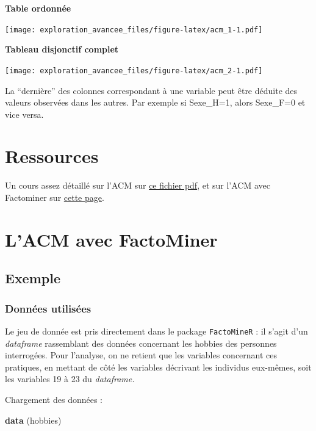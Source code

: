 \documentclass[]{book}
\newenvironment{Shaded}{\begin{snugshade}}{\end{snugshade}}
\newcommand{\KeywordTok}[1]{\textcolor[rgb]{0.13,0.29,0.53}{\textbf{#1}}}
\newcommand{\NormalTok}[1]{#1}
\begin{document}
\textbf{Table ordonnée}

\texttt{[image: exploration\_avancee\_files/figure-latex/acm\_1-1.pdf]}

\textbf{Tableau disjonctif complet}

\texttt{[image: exploration\_avancee\_files/figure-latex/acm\_2-1.pdf]}

La ``dernière'' des colonnes correspondant à une variable peut être déduite des valeurs observées dans les autres. Par exemple si Sexe\_H=1, alors Sexe\_F=0 et vice versa.

\hypertarget{ressources-1}{%
\section{Ressources}\label{ressources-1}}

Un cours assez détaillé sur l'ACM sur \href{https://www.math.u-bordeaux.fr/~machaven/wordpress/wp-content/uploads/2013/10/ACM.pdf}{ce fichier pdf}, et sur l'ACM avec Factominer sur \href{http://factominer.free.fr/factomethods/analyse-des-correspondances-multiples.html}{cette page}.

\hypertarget{lacm-avec-factominer}{%
\section{L'ACM avec FactoMiner}\label{lacm-avec-factominer}}

\hypertarget{exemple-1}{%
\subsection{Exemple}\label{exemple-1}}

\hypertarget{donnees-utilisees-2}{%
\subsubsection{Données utilisées}\label{donnees-utilisees-2}}

Le jeu de donnée est pris directement dans le package \texttt{FactoMineR} : il s'agit d'un \emph{dataframe} rassemblant des données concernant les hobbies des personnes interrogées. Pour l'analyse, on ne retient que les variables concernant ces pratiques, en mettant de côté les variables décrivant les individus eux-mêmes, soit les variables 19 à 23 du \emph{dataframe.}

Chargement des données :

\begin{Shaded}
\begin{Highlighting}[]
\KeywordTok{data}\NormalTok{ (hobbies)}
\end{Highlighting}
\end{Shaded}
\end{document}
